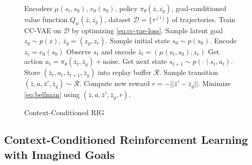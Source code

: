 \documentclass{article}
\begin{document}
\begin{figure}
    \begin{minipage}[t]{0.99\linewidth}
        \begin{algorithm}[H]
           	\footnotesize
           	\caption{Context-Conditioned RIG}
           	\label{alg:tbd}
           	\begin{algorithmic}[1]
            \REQUIRE Encoders $\mu(s_t, s_0)$, $e_0(s_0)$, policy $\pi_\theta(\bar{z}, \bar{z_g})$, goal-conditioned value function $Q_w(\bar{z}, \bar{z_g})$, dataset $\mathcal D = \{\tau^{(i)}\}$ of trajectories.
            \STATE Train CC-VAE on $\mathcal D$ by optimizing \eqref{eq:cc-vae-loss}.
                \STATE Sample latent goal $z_g \sim p(z)$, $\bar{z}_g = (z_g, z_c)$.
                \STATE Sample initial state $s_0 \sim p(s_0)$.
                \STATE Encode $z_c = e_0(s_0)$
                    \STATE Observe $s_t$ and encode $\bar{z}_t = (\mu(s_t, s_0), z_c)$
                    \STATE Get action $a_t = \pi_\theta(\bar{z}_t, \bar{z}_g) + \text{noise}$.
                    \STATE Get next state $s_{t+1} \sim p(\cdot \mid s_t, a_t)$.
                    \STATE Store $(\bar{z}_t, a_t, \bar{z}_{t+1}, \bar{z}_g)$ into replay buffer $\mathcal R$.
                    \STATE Sample transition $(\bar{z}, a, \bar{z}', \bar{z}_g) \sim \mathcal R$.
                    \STATE Compute new reward $r = -||\bar{z}' - \bar{z}_g||$.
                    \STATE Minimize \eqref{eq:bellman} using $(\bar{z}, a, \bar{z}', \bar{z}_g, r)$.
                \ENDFOR
            \ENDFOR
           	\end{algorithmic}
        \end{algorithm}
        \vspace{-0.2cm}
    \end{minipage}
\end{figure}

\subsection{Context-Conditioned Reinforcement Learning with Imagined Goals}
\label{sec:ccrig}

\end{document}
